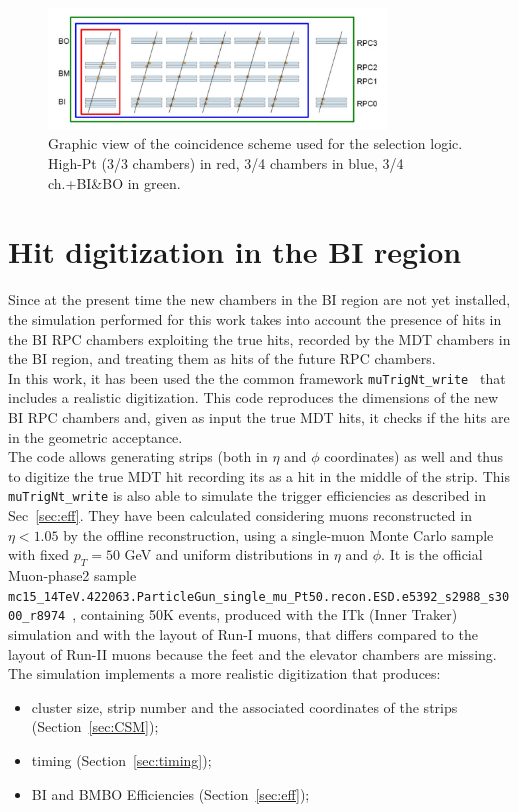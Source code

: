 \begin{figure}[!h]
	\centering
	\includegraphics[width=0.8\textwidth]{Chapters/CH3/figures/trig_scheme}
	\caption{Graphic view of the coincidence scheme used for the selection logic. High-Pt (3/3 chambers) in red, 3/4 chambers in blue, 3/4 ch.+BI\&BO in green.}
	\label{fig:trig_scheme}
\end{figure}

\section{Hit digitization in the BI region}
\label{sec:trigScheme}
Since at the present time the new chambers in the BI region are not yet installed,
the simulation performed for this work takes into account the presence 
of hits in the BI RPC chambers exploiting the true hits, recorded 
by the MDT chambers in the BI region, and treating them as hits of the future RPC chambers.\\
In this work, it has been used the the common framework \texttt{muTrigNt\_write}~\cite{muTrigNt} that includes a realistic digitization.
This code reproduces the dimensions of the new BI RPC chambers and, 
given as input the true MDT hits, it checks if the hits are in the geometric 
acceptance.\\
\noindent The code allows generating strips (both in $\eta$ and $\phi$ coordinates) as well
and thus to digitize the true MDT hit recording its as a hit in the middle of the strip. 
This \texttt{muTrigNt\_write} is also able to simulate the trigger efficiencies as described in Sec~\ref{sec:eff}. 
They have been calculated considering muons reconstructed in $\eta < 1.05$ by the offline reconstruction, using a single-muon Monte Carlo sample with fixed $p_{T} = 50$ GeV and uniform distributions in $\eta$ and $\phi$. It is the official Muon-phase2 sample {\scriptsize\texttt{mc15\_14TeV.422063.ParticleGun\_single\_mu\_Pt50.recon.ESD.e5392\_s2988\_s3000\_r8974}}~\cite{Muontwiki}, containing 50K events, produced with the ITk (Inner Traker) simulation and with the layout of Run-I muons, that differs compared to the layout of Run-II muons because the feet and the elevator chambers are missing.
The simulation implements a more realistic digitization that produces:
\begin{itemize}
	\item cluster size, strip number and the associated coordinates of the strips (Section~\ref{sec:CSM});
	\item timing (Section~\ref{sec:timing});
	\item BI and BMBO Efficiencies (Section~\ref{sec:eff});
\end{itemize}

